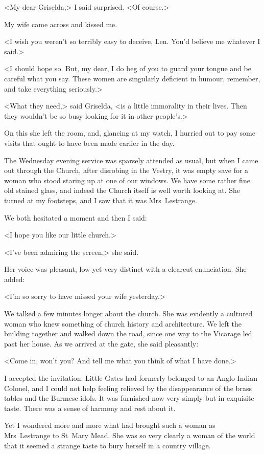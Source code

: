 <My dear Griselda,> I said surprised. <Of course.>

My wife came across and kissed me.

<I wish you weren't so terribly easy to deceive, Len. You'd believe me whatever I said.>

<I should hope so. But, my dear, I do beg of you to guard your tongue and be careful what you say. These women are singularly deficient in humour, remember, and take everything seriously.>

<What they need,> said Griselda, <is a little immorality in their lives. Then they wouldn't be so busy looking for it in other people's.>

On this she left the room, and, glancing at my watch, I hurried out to pay some visits that ought to have been made earlier in the day.

The Wednesday evening service was sparsely attended as usual, but when I came out through the Church, after disrobing in the Vestry, it was empty save for a woman who stood staring up at one of our windows. We have some rather fine old stained glass, and indeed the Church itself is well worth looking at. She turned at my footsteps, and I saw that it was Mrs~Lestrange.

We both hesitated a moment and then I said:

<I hope you like our little church.>

<I've been admiring the screen,> she said.

Her voice was pleasant, low yet very distinct with a clearcut enunciation. She added:

<I'm so sorry to have missed your wife yesterday.>

We talked a few minutes longer about the church. She was evidently a cultured woman who knew something of church history and architecture. We left the building together and walked down the road, since one way to the Vicarage led past her house. As we arrived at the gate, she said pleasantly:

<Come in, won't you? And tell me what you think of what I have done.>

I accepted the invitation. Little Gates had formerly belonged to an Anglo-Indian Colonel, and I could not help feeling relieved by the disappearance of the brass tables and the Burmese idols. It was furnished now very simply but in exquisite taste. There was a sense of harmony and rest about it.

Yet I wondered more and more what had brought such a woman as Mrs~Lestrange to St~Mary Mead. She was so very clearly a woman of the world that it seemed a strange taste to bury herself in a country village.

